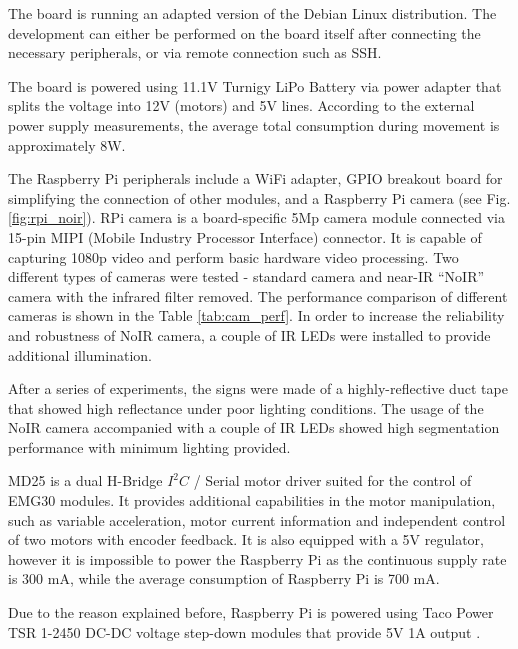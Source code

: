 The board is running an adapted version of the Debian Linux distribution. The
development can either be performed on the board itself after connecting the
necessary peripherals, or via remote connection such as SSH.

The board is powered using 11.1V Turnigy LiPo Battery via power adapter that
splits the voltage into 12V (motors) and 5V lines. According to the external
power supply measurements, the average total consumption during movement is
approximately 8W.

The Raspberry Pi peripherals include a WiFi adapter, GPIO breakout board for
simplifying the connection of other modules, and a Raspberry Pi camera (see
Fig. \ref{fig:rpi_noir}).
RPi camera is a board-specific 5Mp camera module connected via 15-pin MIPI (Mobile Industry
Processor Interface) connector. It is capable of capturing 1080p video and
perform basic hardware video processing. Two different types of cameras were
tested - standard camera and near-IR ``NoIR'' camera with the infrared filter
removed.
The performance comparison of different cameras is shown in the Table
\ref{tab:cam_perf}.  In order to increase the reliability and robustness of 
NoIR camera, a couple of IR LEDs were installed to provide additional illumination.

After a series of experiments, the signs were made of a highly-reflective duct
tape that showed high reflectance under poor lighting
conditions. The usage of the NoIR camera accompanied with a couple of IR LEDs
showed high segmentation performance with minimum lighting provided.

MD25 is a dual H-Bridge $I^2C$ / Serial motor driver suited for the control of
EMG30 modules.
It provides additional capabilities in the motor manipulation, such as variable
acceleration, motor current information and independent control of two motors
with encoder feedback. It is also equipped with a 5V regulator, however it is
impossible to power the Raspberry Pi as the continuous supply rate is 300 mA,
while the average consumption of Raspberry Pi is 700 mA.

Due to the reason explained before, Raspberry Pi is powered using Taco Power TSR
1-2450 DC-DC voltage step-down modules that provide 5V 1A output \cite{taco}.

